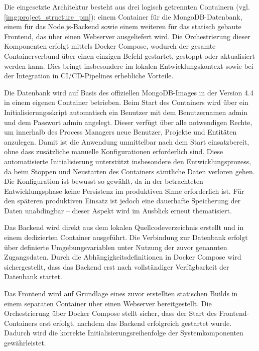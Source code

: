 Die eingesetzte Architektur besteht aus drei logisch getrennten Containern (vgl. \autoref{img:project_structure_pm}): einem Container für die MongoDB-Datenbank, einem für das Node.js-Backend sowie einem weiteren für das statisch gebaute Frontend, das über einen Webserver ausgeliefert wird. Die Orchestrierung dieser Komponenten erfolgt mittels Docker Compose, wodurch der gesamte Containerverbund über einen einzigen Befehl gestartet, gestoppt oder aktualisiert werden kann. Dies bringt insbesondere im lokalen Entwicklungskontext sowie bei der Integration in CI/CD-Pipelines erhebliche Vorteile.

Die Datenbank wird auf Basis des offiziellen MongoDB-Images in der Version 4.4 in einem eigenen Container betrieben. Beim Start des Containers wird über ein Initialisierungsskript automatisch ein Benutzer mit dem Benutzernamen admin und dem Passwort admin angelegt. Dieser verfügt über alle notwendigen Rechte, um innerhalb des Process Managers neue Benutzer, Projekte und Entitäten anzulegen. Damit ist die Anwendung unmittelbar nach dem Start einsatzbereit, ohne dass zusätzliche manuelle Konfigurationen erforderlich sind. Diese automatisierte Initialisierung unterstützt insbesondere den Entwicklungsprozess, da beim Stoppen und Neustarten des Containers sämtliche Daten verloren gehen. Die Konfiguration ist bewusst so gewählt, da in der betrachteten Entwicklungsphase keine Persistenz im produktiven Sinne erforderlich ist. Für den späteren produktiven Einsatz ist jedoch eine dauerhafte Speicherung der Daten unabdingbar – dieser Aspekt wird im Ausblick erneut thematisiert.

Das Backend wird direkt aus dem lokalen Quellcodeverzeichnis erstellt und in einem dedizierten Container ausgeführt. Die Verbindung zur Datenbank erfolgt über definierte Umgebungsvariablen unter Nutzung der zuvor genannten Zugangsdaten. Durch die Abhängigkeitsdefinitionen in Docker Compose wird sichergestellt, dass das Backend erst nach vollständiger Verfügbarkeit der Datenbank startet.

Das Frontend wird auf Grundlage eines zuvor erstellten statischen Builds in einem separaten Container über einen Webserver bereitgestellt. Die Orchestrierung über Docker Compose stellt sicher, dass der Start des Frontend-Containers erst erfolgt, nachdem das Backend erfolgreich gestartet wurde. Dadurch wird die korrekte Initialisierungsreihenfolge der Systemkomponenten gewährleistet.

